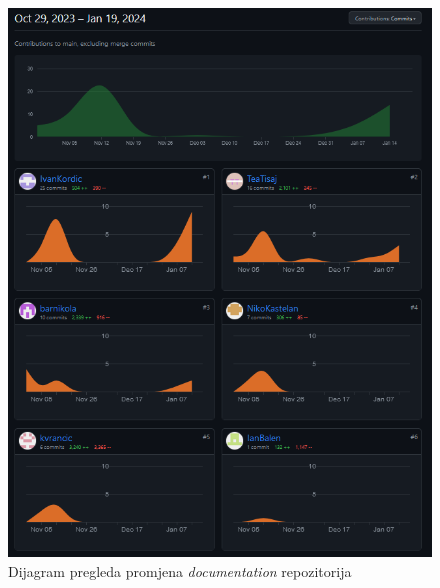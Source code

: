 	
		\begin{figure}[h]
 		   \centering
  		  \includegraphics[width=\textwidth]{slike/documentationGitHub.png} 
   		 \caption{Dijagram pregleda promjena \textit{documentation} repozitorija}
   		 \label{fig:my_image}
		\end{figure}
		\eject
  
		
	
